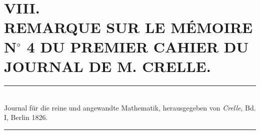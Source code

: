 \documentclass[oneside, 12 pt, leqno]{memoir}
\begin{document}
\setlength{\abovedisplayskip}{0.33\baselineskip plus .16\baselineskip minus .16\baselineskip}
\setlength{\belowdisplayskip}{0.33\baselineskip plus .16\baselineskip minus .16\baselineskip}

\;\\ [3\baselineskip]
\section*{{\Large VIII.} \\ [\baselineskip]
REMARQUE SUR LE MÉMOIRE N\(^{\circ}\) 4 DU PREMIER CAHIER DU JOURNAL DE M. CRELLE.}
\begin{center}
\rule{2in}{0.1pt}\\
{\tiny Journal für die reine und angewandte Mathematik, herausgegeben von \textit{Crelle}, Bd. I, Berlin 1826.}\\
\rule{2in}{0.1pt}
\end{center}
\end{document}
